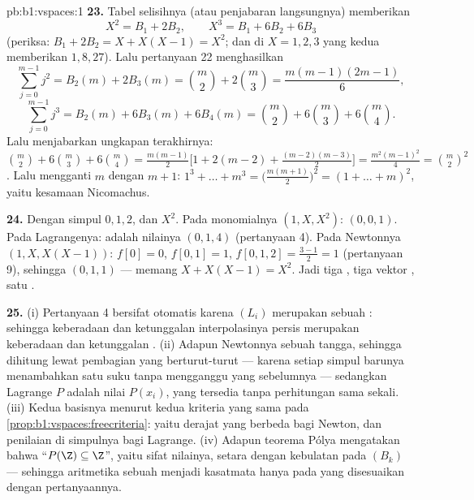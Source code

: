 \begin{solution}{pb:b1:vspaces:1}
\textbf{23.} Tabel selisihnya (atau penjabaran langsungnya) memberikan
\[
X^2 = B_1 + 2 B_2, \qquad X^3 = B_1 + 6 B_2 + 6 B_3
\]
(periksa: $B_1 + 2B_2 = X + X(X-1) = X^2$; dan di $X = 1, 2, 3$ yang
kedua memberikan $1, 8, 27$). Lalu pertanyaan 22 menghasilkan
\[
\sum_{j=0}^{m-1} j^2 = B_2(m) + 2B_3(m)
= \binom m2 + 2\binom m3 = \frac{m(m-1)(2m-1)}{6},
\]
\[
\sum_{j=0}^{m-1} j^3 = B_2(m) + 6B_3(m) + 6B_4(m)
= \binom m2 + 6\binom m3 + 6\binom m4 .
\]
Lalu menjabarkan ungkapan terakhirnya: $\binom m2 + 6\binom m3 + 6\binom
m4 = \frac{m(m-1)}{2}\bigl[1 + 2(m-2) +
\frac{(m-2)(m-3)}{2}\bigr] = \frac{m^2(m-1)^2}{4} = \binom m2^2$.
Lalu mengganti $m$ dengan $m + 1$: $1^3 + \dots + m^3 =
\bigl(\frac{m(m+1)}2\bigr)^2 = (1 + \dots + m)^2$, yaitu kesamaan
Nicomachus.

\textbf{24.} Dengan simpul $0, 1, 2$, dan  $X^2$. Pada  monomialnya
$(1, X, X^2)$:  $(0, 0, 1)$. Pada  Lagrangenya:
 adalah nilainya $(0, 1, 4)$ (pertanyaan 4). Pada  Newtonnya
$(1, X, X(X-1))$:  $f[0] = 0$, $f[0,1] = 1$,
$f[0,1,2] = \frac{3 - 1}{2} = 1$ (pertanyaan 9), sehingga 
$(0, 1, 1)$ --- memang $X + X(X-1) = X^2$. Jadi tiga , tiga
vektor , satu .

\textbf{25.} (i) Pertanyaan 4 bersifat otomatis karena $(L_i)$ merupakan
sebuah \emph{}: sehingga keberadaan dan ketunggalan interpolasinya
persis merupakan keberadaan dan ketunggalan . (ii) Adapun 
Newtonnya sebuah tangga, sehingga  dihitung lewat pembagian yang
berturut-turut --- karena setiap simpul barunya menambahkan satu suku tanpa mengganggu
yang sebelumnya --- sedangkan  Lagrange $P$ adalah
nilai $P(x_i)$, yang tersedia tanpa perhitungan sama sekali. (iii) Kedua
basisnya  menurut kedua kriteria yang sama pada
\cref{prop:b1:vspaces:freecriteria}: yaitu derajat yang berbeda bagi Newton,
dan penilaian di simpulnya bagi Lagrange. (iv) Adapun teorema Pólya mengatakan
bahwa ``$P(\Z) \subseteq \Z$'', yaitu sifat nilainya, setara
dengan kebulatan  pada  $(B_k)$ --- sehingga
aritmetika sebuah  menjadi kasatmata hanya pada 
yang disesuaikan dengan pertanyaannya.

\end{solution}
